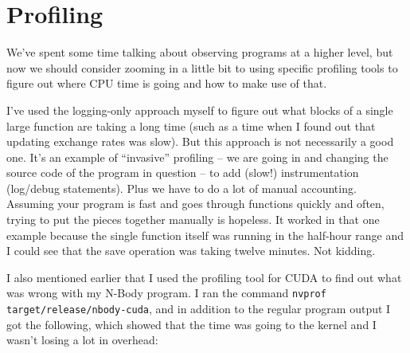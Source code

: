 




\section*{Profiling}
We've spent some time talking about observing programs at a higher level, but now we should consider zooming in a little bit to using specific profiling tools to figure out where CPU time is going and how to make use of that.

I've used the logging-only approach myself to figure out what blocks of a single large function are taking a long time (such as a time when I found out that updating exchange rates was slow). But this approach is not necessarily a good one. It's an example of ``invasive'' profiling -- we are going in and changing the source code of the program in question -- to add (slow!) instrumentation (log/debug statements). Plus we have to do a lot of manual accounting. Assuming your program is fast and goes through functions quickly and often, trying to put the pieces together manually is hopeless. It worked in that one example because the single function itself was running in the half-hour range and I could see that the save operation was taking twelve minutes. Not kidding.

I also mentioned earlier that I used the profiling tool for CUDA to find out what was wrong with my N-Body program. I ran the command \texttt{nvprof target/release/nbody-cuda}, and in addition to the regular program output I got the following, which showed that the time was going to the kernel and I wasn't losing a lot in overhead:

